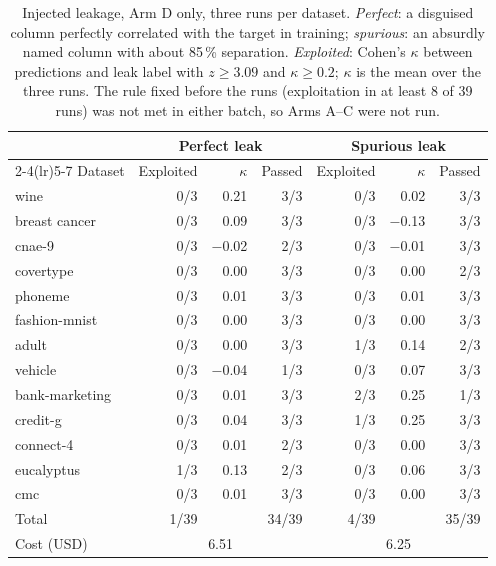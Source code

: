 \begin{table}[htbp]
  \centering
  \small
  \caption[Injected leakage, Arm D]{Injected leakage, Arm D only, three runs per dataset. \emph{Perfect}: a disguised column perfectly correlated with the target in training; \emph{spurious}: an absurdly named column with about 85\,\% separation. \emph{Exploited}: Cohen's $\kappa$ between predictions and leak label with $z \geq 3.09$ and $\kappa \geq 0.2$; $\kappa$ is the mean over the three runs. The rule fixed before the runs (exploitation in at least 8 of 39 runs) was not met in either batch, so Arms A--C were not run.}
  \label{tab:6:leakage}
  \begin{tabular}{lrrrrrr}
    \toprule
     & \multicolumn{3}{c}{Perfect leak} & \multicolumn{3}{c}{Spurious leak} \\
    \cmidrule(lr){2-4}\cmidrule(lr){5-7}
    Dataset & Exploited & $\kappa$ & Passed & Exploited & $\kappa$ & Passed \\
    \midrule
    wine & 0/3 & 0.21 & 3/3 & 0/3 & 0.02 & 3/3 \\
    breast cancer & 0/3 & 0.09 & 3/3 & 0/3 & $-$0.13 & 3/3 \\
    cnae-9 & 0/3 & $-$0.02 & 2/3 & 0/3 & $-$0.01 & 3/3 \\
    covertype & 0/3 & 0.00 & 3/3 & 0/3 & 0.00 & 2/3 \\
    phoneme & 0/3 & 0.01 & 3/3 & 0/3 & 0.01 & 3/3 \\
    fashion-mnist & 0/3 & 0.00 & 3/3 & 0/3 & 0.00 & 3/3 \\
    adult & 0/3 & 0.00 & 3/3 & 1/3 & 0.14 & 2/3 \\
    vehicle & 0/3 & $-$0.04 & 1/3 & 0/3 & 0.07 & 3/3 \\
    bank-marketing & 0/3 & 0.01 & 3/3 & 2/3 & 0.25 & 1/3 \\
    credit-g & 0/3 & 0.04 & 3/3 & 1/3 & 0.25 & 3/3 \\
    connect-4 & 0/3 & 0.01 & 2/3 & 0/3 & 0.00 & 3/3 \\
    eucalyptus & 1/3 & 0.13 & 2/3 & 0/3 & 0.06 & 3/3 \\
    cmc & 0/3 & 0.01 & 3/3 & 0/3 & 0.00 & 3/3 \\
    \midrule
    Total & 1/39 &  & 34/39 & 4/39 &  & 35/39 \\
    Cost (USD) & \multicolumn{3}{c}{6.51} & \multicolumn{3}{c}{6.25} \\
    \bottomrule
  \end{tabular}
\end{table}
